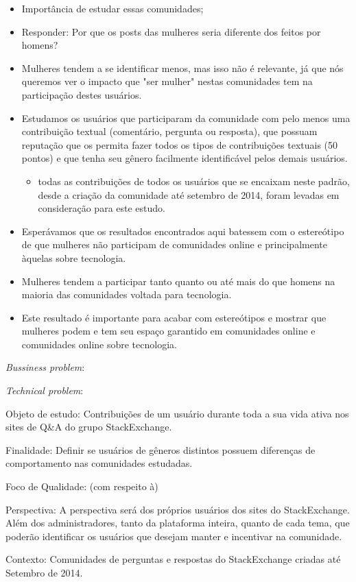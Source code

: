\begin{itemize}
	\item Importância de estudar essas comunidades;
	\item Responder: Por que os posts das mulheres seria diferente dos feitos por homens?
	\item Mulheres tendem a se identificar menos, mas isso não é relevante, já que nós queremos ver o impacto que "ser mulher" nestas comunidades tem na participação destes usuários.
	\item Estudamos os usuários que participaram da comunidade com pelo menos uma contribuição textual (comentário, pergunta ou resposta), que possuam reputação que os permita fazer todos os tipos de contribuições textuais (50 pontos) e que tenha seu gênero facilmente identificável pelos demais usuários.
	\begin{itemize}
		\item todas as contribuições de todos os usuários que se encaixam neste padrão, desde a criação da comunidade até setembro de 2014, foram levadas em consideração para este estudo.
	\end{itemize}
	\item Esperávamos que os resultados encontrados aqui batessem com o estereótipo de que mulheres não participam de comunidades online e principalmente àquelas sobre tecnologia.
	\item Mulheres tendem a participar tanto quanto ou até mais do que homens na maioria das comunidades voltada para tecnologia. 
	\item Este resultado é importante para acabar com estereótipos e mostrar que mulheres podem e tem seu espaço garantido em comunidades online e comunidades online sobre tecnologia.
\end{itemize}

\emph{Bussiness problem}: 

\emph{Technical problem}: 

Objeto de estudo: Contribuições de um usuário durante toda a sua vida ativa nos sites de Q\&A do grupo StackExchange.

Finalidade: Definir se usuários de gêneros distintos possuem diferenças de comportamento nas comunidades estudadas.

Foco de Qualidade: (com respeito à)

Perspectiva: A perspectiva será dos próprios usuários dos sites do StackExchange. Além dos administradores, tanto da plataforma inteira, quanto de cada tema, que poderão identificar os usuários que desejam manter e incentivar na comunidade.

Contexto: Comunidades de perguntas e respostas do StackExchange criadas até Setembro de 2014.